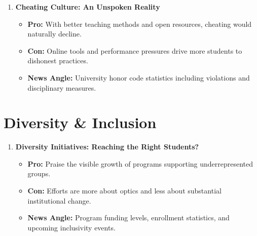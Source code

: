 \documentclass{article}
\begin{document}
\begin{enumerate}[leftmargin=*]
    \item \textbf{Cheating Culture: An Unspoken Reality}
    \begin{itemize}
        \item \textbf{Pro:} With better teaching methods and open resources, cheating would naturally decline.
        \item \textbf{Con:} Online tools and performance pressures drive more students to dishonest practices.
        \item \textbf{News Angle:} University honor code statistics including violations and disciplinary measures.
    \end{itemize}
\end{enumerate}

\section*{Diversity \& Inclusion}

\begin{enumerate}[leftmargin=*]
    \item \textbf{Diversity Initiatives: Reaching the Right Students?}
    \begin{itemize}
        \item \textbf{Pro:} Praise the visible growth of programs supporting underrepresented groups.
        \item \textbf{Con:} Efforts are more about optics and less about substantial institutional change.
        \item \textbf{News Angle:} Program funding levels, enrollment statistics, and upcoming inclusivity events.
    \end{itemize}
\end{enumerate}
\end{document}
